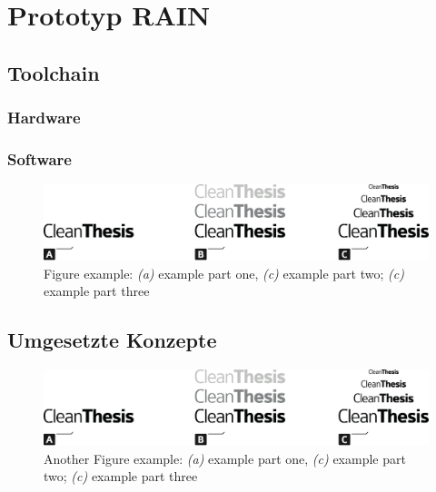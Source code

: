 %
\chapter{Prototyp RAIN}
\label{sec:system}


\Blindtext[2][1]

\section{Toolchain}
\label{sec:system:toolchain}
\subsection{Hardware}
\subsection{Software}
\Blindtext[1][2]

\begin{figure}[htb]
	\includegraphics[width=\textwidth]{gfx/Clean-Thesis-Figure}
	\caption{Figure example: \textit{(a)} example part one, \textit{(c)} example part two; \textit{(c)} example part three}
	\label{fig:system:example1}
\end{figure}

\Blindtext[1][2]

\section{Umgesetzte Konzepte}
\label{sec:system:realizedstuff}

\Blindtext[1][2]

\begin{figure}[htb]
	\includegraphics[width=\textwidth]{gfx/Clean-Thesis-Figure}
	\caption{Another Figure example: \textit{(a)} example part one, \textit{(c)} example part two; \textit{(c)} example part three}
	\label{fig:system:example2}
\end{figure}

\Blindtext[2][2]

